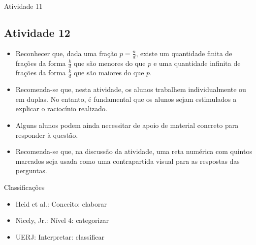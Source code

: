 \documentclass[oneside]{book}
\begin{document}
\begin{multicols}{2}
\begin{resposta*}{Atividade 11}
 \end{resposta*}




\subsection{Atividade 12}

\begin{itemize} %
    \item       Reconhecer que, dada uma fração       $p = \frac{n}{d}$, existe 
um quantidade finita de frações da forma       $\frac{k}{d}$       que são 
menores do que       $p$       e uma quantidade infinita de frações da forma     
  $\frac{k}{d}$       que são maiores do que       $p$.
\end{itemize} %
  
  
 
\begin{itemize} %
    \item       Recomenda-se que, nesta atividade, os alunos trabalhem 
individualmente ou em duplas. No entanto, é fundamental que os alunos sejam 
estimulados a explicar o raciocínio realizado.
    \item       Alguns alunos podem ainda necessitar de apoio de material 
concreto para responder à questão.
    \item       Recomenda-se que, na discussão da atividade, uma reta numérica 
com quintos marcados seja usada como uma contrapartida visual para as respostas 
das perguntas.
\end{itemize} %
  

\noindent {}
  
  
Classificações  
\begin{itemize} %
    \item       Heid et al.: Conceito: elaborar
    \item       Nicely, Jr.: Nível 4: categorizar
    \item       UERJ: Interpretar: classificar
\end{itemize} %
  


\end{multicols}
\end{document}
